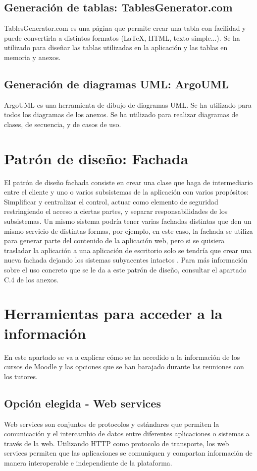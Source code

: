 \subsection{Generación de tablas: TablesGenerator.com}
TablesGenerator.com es una página que permite crear una tabla con facilidad y puede convertirla a distintos formatos (LaTeX, HTML, texto simple...). Se ha utilizado para diseñar las tablas utilizadas en la aplicación y las tablas en memoria y anexos.
\subsection{Generación de diagramas UML: ArgoUML}
ArgoUML es una herramienta de dibujo de diagramas UML. Se ha utilizado para todos los diagramas de los anexos. Se ha utilizado para realizar diagramas de clases, de secuencia, y de casos de uso.

\section{Patrón de diseño: Fachada}
El patrón de diseño fachada consiste en crear una clase que haga de intermediario entre el cliente y uno o varios subsistemas de la aplicación con varios propósitos: Simplificar y centralizar el control, actuar como elemento de seguridad restringiendo el acceso a ciertas partes, y separar responsabilidades de los subsistemas. Un mismo sistema podría tener varias fachadas distintas que den un mismo servicio de distintas formas, por ejemplo, en este caso, la fachada se utiliza para generar parte del contenido de la aplicación web, pero si se quisiera trasladar la aplicación a una aplicación de escritorio solo se tendría que crear una nueva fachada dejando los sistemas subyacentes intactos \cite{gamma1995design}. Para más información sobre el uso concreto que se le da a este patrón de diseño, consultar el apartado C.4 de los anexos.

 \section{Herramientas para acceder a la información}
En este apartado se va a explicar cómo se ha accedido a la información de los cursos de Moodle y las opciones que se han barajado durante las reuniones con los tutores.
\subsection{Opción elegida - Web services}
Web services son conjuntos de protocolos y estándares que permiten la comunicación y el intercambio de datos entre diferentes aplicaciones o sistemas a través de la web. Utilizando HTTP como protocolo de transporte, los web services permiten que las aplicaciones se comuniquen y compartan información de manera interoperable e independiente de la plataforma.

